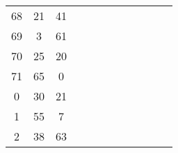 \begin{table}[tb]
\begin{tabular}{|c|c|c|lllllllll}
	68 & 21 & 41 &                         &                         &                         &                         &                         &                         &                         &                         &                         \\ \cline{1-3}
	69 & 3  & 61 &                         &                         &                         &                         &                         &                         &                         &                         &                         \\ \cline{1-3}
	70 & 25 & 20 &                         &                         &                         &                         &                         &                         &                         &                         &                         \\ \cline{1-3}
	71 & 65 & 0  &                         &                         &                         &                         &                         &                         &                         &                         &                         \\ \cline{1-3}
	0  & 30 & 21 &                         &                         &                         &                         &                         &                         &                         &                         &                         \\ \cline{1-3}
	1  & 55 & 7  &                         &                         &                         &                         &                         &                         &                         &                         &                         \\ \cline{1-3}
	2  & 38 & 63 &                         &                         &                         &                         &                         &                         &                         &                         &                         \\ \cline{1-3}
\end{tabular}
	
	
\end{table}


